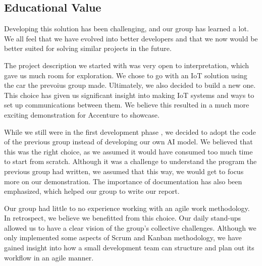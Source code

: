 \subsection{Educational Value}
Developing this solution has been challenging, and our group has learned a lot. We all feel that we have evolved into better developers and that we now would be better suited for solving similar projects in the future. 

The project description we started with was very open to interpretation, which gave us much room for exploration. We chose to go with an IoT solution using the car the prevoius group made. Ultimately, we also decided to build a new one. This choice has given us significant insight into making IoT systems and ways to set up communications between them. We believe this resulted in a much more exciting demonstration for Accenture to showcase.

While we still were in the first development phase , we decided to adopt the code of the previous group instead of developing our own AI model. We believed that this was the right choice, as we assumed it would have consumed too much time to start from scratch. Although it was a challenge to understand the program the previous group had written, we assumed that this way, we would get to focus more on our demonstration. The importance of documentation has also been emphasized, which helped our group to write our report. 

Our group had little to no experience working with an agile work methodology. In retrospect, we believe we benefitted from this choice. Our daily stand-ups allowed us to have a clear vision of the group's collective challenges. Although we only implemented some aspects of Scrum and Kanban methodology, we have gained insight into how a small development team can structure and plan out its workflow in an agile manner.
